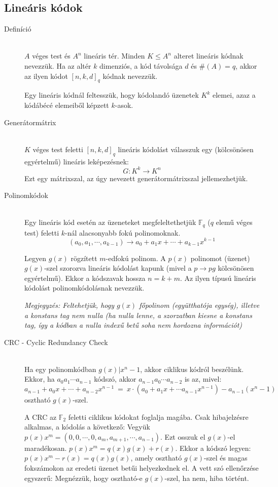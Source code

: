 \documentclass[margin=0px]{article}
\begin{document}
		\subsection{Lineáris kódok}
			\begin{description}
				\item[Definíció] \hfill \\
					$A$ véges test és $A^n$ lineáris tér. Minden $ K \leq A^n$ alteret lineáris kódnak nevezzük. Ha az altér $k$ dimenziós, a kód távolsága $d$ és $\#(A) = q$, akkor az ilyen kódot $[n,k,d]_q$ kódnak nevezzük.  	
					
					Egy lineáris kódnál feltesszük, hogy kódolandó üzenetek $K^k$ elemei, azaz a kódábécé elemeiből képzett $k$-asok.
				\item[Generátormátrix] \hfill \\
					$K$ véges test feletti $[n,k,d]_q$ lineáris kódolást válasszuk egy (kölcsönösen egyértelmű) lineáris leképezésnek:
					\[ G:K^k \rightarrow K^n \] 
					Ezt egy mátrixszal, az úgy nevezett generátormátrixszal jellemezhetjük.
				\item[Polinomkódok] \hfill \\
					Egy lineáris kód esetén az üzeneteket megfeleltethetjük $\mathbb{F}_q$ ($q$ elemű véges test) feletti $k$-nál alacsonyabb fokú polinomoknak. 
					\[(a_0,a_1,\cdots,a_{k-1}) \rightarrow a_0+a_1x+\cdots+a_{k-1}x^{k-1} \]
					
					Legyen $g(x)$ rögzített $m$-edfokú polinom. A $p(x)$ polinomot (üzenet) $g(x)$-szel szorozva lineáris kódolást kapunk (mivel a $p \rightarrow pg$ kölcsönösen egyértelmű). Ekkor a kódszavak hossza $n=k+m$. Az ilyen típusú lineáris kódolást polinomkódolásnak nevezzük.
					
					\textit{Megjegyzés: Feltehetjük, hogy $g(x)$ főpolinom (együtthatója egység), illetve a konstans tag nem nulla (ha nulla lenne, a szorzatban kiesne a konstans tag, így a kódban a nulla indexű betű soha nem hordozna információt)}
				\item[CRC - Cyclic Redundancy Check] \hfill \\
					Ha egy polinomkódban $g(x) | x^n-1$, akkor ciklikus kódról beszélünk. Ekkor, ha $a_0a_1\cdots a_{n-1}$ kódszó, akkor $a_{n-1}a_0\cdots a_{n-2}$ is az, mivel:
					\[ a_{n-1}+a_0x+\cdots+a_{n-2}x^{n-1} \ = \ x\cdot(a_0+a_1x+\cdots a_{n-1}x^{n-1})-a_{n-1}(x^n-1) \]
					osztható $g(x)$-szel.
					
					A CRC az $\mathbb{F}_2$ feletti ciklikus kódokat foglalja magába. Csak hibajelzésre alkalmas, a kódolás a következő: Vegyük $p(x)x^m = (0,0,\cdots,0,a_m,a_{m+1},\cdots,a_{n-1})$. Ezt osszuk el $g(x)$-el maradékosan. $p(x)x^m = q(x)g(x)+r(x)$. Ekkor a kódszó legyen: $p(x)x^m-r(x) = q(x)g(x)$, amely osztható $g(x)$-szel és magas fokszámokon az eredeti üzenet betűi helyezkednek el. A vett szó ellenőrzése egyszerű: Megnézzük, hogy osztható-e $g(x)$-szel, ha nem, hiba történt.
			\end{description}
\end{document}
